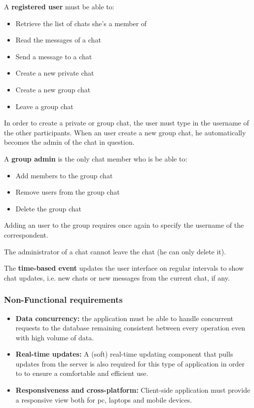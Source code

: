 \documentclass[10pt]{article}
\begin{document}
A \textbf{registered user} must be able to:
\begin{itemize}
    \item Retrieve the list of chats she's a member of
    \item Read the messages of a chat
    \item Send a message to a chat
    \item Create a new private chat
    \item Create a new group chat
    \item Leave a group chat
\end{itemize}

In order to create a private or group chat, the user must type in the username
of the other participants.
When an user create a new group chat, he automatically becomes the admin of the chat in question.

A \textbf{group admin} is the only chat member who is be able to:
\begin{itemize}
    \item Add members to the group chat
    \item Remove users from the group chat
    \item Delete the group chat
\end{itemize}

Adding an user to the group requires once again to specify the username of the 
correspondent. 

The administrator of a chat cannot leave the chat (he can only delete it).

The \textbf{time-based event} updates the user interface on regular intervals
to show chat updates, i.e. new chats or new messages from the current chat, if any.

\subsubsection{Non-Functional requirements}
\begin{itemize}
	\item \textbf{Data concurrency:} the application must be able to handle concurrent requests to the database remaining consistent between every operation even with high volume of data. 
	
	\item \textbf{Real-time updates:} A (soft) real-time updating component that pulls updates from the server is also required for this type of application in order to to ensure a comfortable and efficient use.
	
	\item \textbf{Responsiveness and cross-platform:} Client-side application must provide a responsive view both for pc, laptops and mobile devices.
	
\end{itemize}
\end{document}
